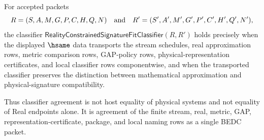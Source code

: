 \begin{definition}
\label{def:reality-constrained-signature-fit-classifier}
For accepted packets
$$
R=(S,A,M,G,P,C,H,Q,N)
\quad\hbox{and}\quad
R'=(S',A',M',G',P',C',H',Q',N'),
$$
the classifier $\mathsf{RealityConstrainedSignatureFitClassifier}(R,R')$ holds precisely when the displayed $\hsame$ data transports the stream schedules, real approximation rows, metric comparison rows, GAP-policy rows, physical-representation certificates, and local classifier rows componentwise, and when the transported classifier preserves the distinction between mathematical approximation and physical-signature compatibility.

Thus classifier agreement is not host equality of physical systems and not equality of Real endpoints alone. It is agreement of the finite stream, real, metric, GAP, representation-certificate, package, and local naming rows as a single BEDC packet.
\end{definition}

